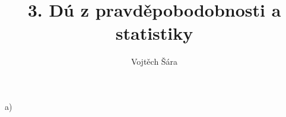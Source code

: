 \documentclass{article}
\title{3. Dú z pravděpobodobnosti a statistiky}
\author{Vojtěch Šára}
\begin{document}
\maketitle
a) 
\end{document}
